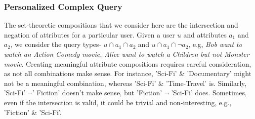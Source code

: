 \subsubsection{Personalized Complex Query}
\vspace{-2pt}
\label{sec:complex_query}
The set-theoretic compositions that we consider here are the intersection and negation of attributes for a particular user. Given a user $u$ and attributes $a_1$ and $a_2$, we consider the query types- $u \cap a_1 \cap a_2$ and $u \cap a_1 \cap \neg a_2$, e.g, \textit{Bob want to watch an Action Comedy movie, Alice want to watch a Children but not Monster movie}. Creating meaningful attribute compositions requires careful consideration, as not all combinations make sense.
For instance, 'Sci-Fi' \& 'Documentary' might not be a meaningful combination, whereas 'Sci-Fi' \& 'Time-Travel' is. Similarly, 'Sci-Fi' 
$\neg$' Fiction' doesn't make sense, but 'Fiction' $\neg$ 'Sci-Fi' does. Sometimes, even if the intersection is valid, it could be trivial and non-interesting, e.g., 'Fiction' \& 'Sci-Fi'.\\
